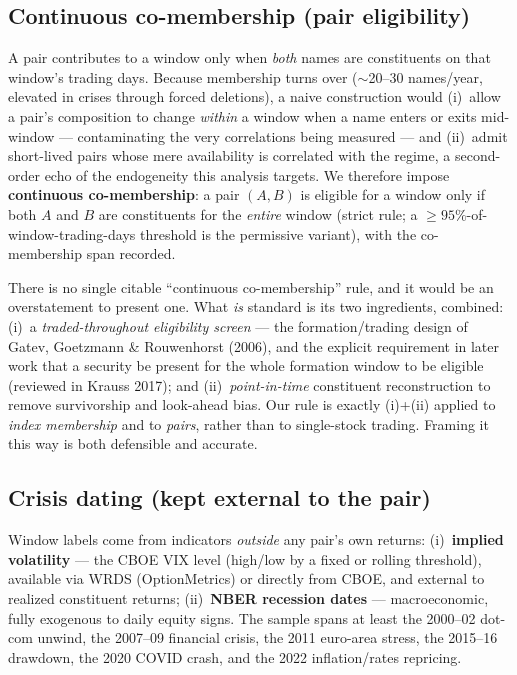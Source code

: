 \documentclass[11pt]{article}
\begin{document}
\subsection{Continuous co-membership (pair eligibility)}
A pair contributes to a window only when \emph{both} names are constituents on that window's
trading days. Because membership turns over ($\sim$20--30 names/year, elevated in crises through
forced deletions), a naive construction would (i)~allow a pair's composition to change
\emph{within} a window when a name enters or exits mid-window --- contaminating the very
correlations being measured --- and (ii)~admit short-lived pairs whose mere availability is
correlated with the regime, a second-order echo of the endogeneity this analysis targets. We
therefore impose \textbf{continuous co-membership}: a pair $(A,B)$ is eligible for a window only
if both $A$ and $B$ are constituents for the \emph{entire} window (strict rule; a
$\ge\!95\%$-of-window-trading-days threshold is the permissive variant), with the co-membership
span recorded.

\begin{cautionbox}
There is no single citable ``continuous co-membership'' rule, and it would be an overstatement
to present one. What \emph{is} standard is its two ingredients, combined: (i)~a
\emph{traded-throughout eligibility screen} --- the formation/trading design of Gatev, Goetzmann
\& Rouwenhorst (2006), and the explicit requirement in later work that a security be present for
the whole formation window to be eligible (reviewed in Krauss 2017); and (ii)~\emph{point-in-time}
constituent reconstruction to remove survivorship and look-ahead bias. Our rule is exactly
(i)+(ii) applied to \emph{index membership} and to \emph{pairs}, rather than to single-stock
trading. Framing it this way is both defensible and accurate.
\end{cautionbox}

\subsection{Crisis dating (kept external to the pair)}
Window labels come from indicators \emph{outside} any pair's own returns:
(i)~\textbf{implied volatility} --- the CBOE VIX level (high/low by a fixed or rolling
threshold), available via WRDS (OptionMetrics) or directly from CBOE, and external to realized
constituent returns; (ii)~\textbf{NBER recession dates} --- macroeconomic, fully exogenous to
daily equity signs. The sample spans at least the 2000--02 dot-com unwind, the 2007--09
financial crisis, the 2011 euro-area stress, the 2015--16 drawdown, the 2020 COVID crash, and
the 2022 inflation/rates repricing.
\end{document}
